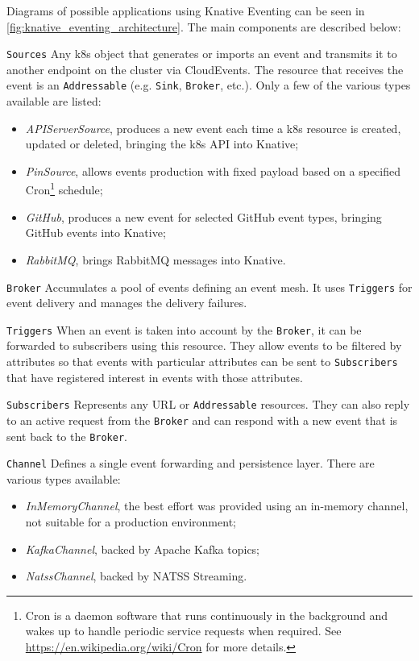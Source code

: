 \documentclass[../thesis.tex]{subfiles}
\begin{document}
Diagrams of possible applications using Knative Eventing can be seen in \autoref{fig:knative_eventing_architecture}. The main components are described below:

\texttt{Sources} Any \gls{k8s} object that generates or imports an event and transmits it to another endpoint on the cluster via CloudEvents. The resource that receives the event is an \texttt{Addressable} (e.g. \texttt{Sink}, \texttt{Broker}, etc.). Only a few of the various types available are listed:

\begin{itemize}
    \item \textit{APIServerSource}, produces a new event each time a \gls{k8s} resource is created, updated or deleted, bringing the \gls{k8s} \acrshort{API} into Knative;
    \item \textit{PinSource}, allows events production with fixed payload based on a specified Cron\footnote{Cron is a daemon software that runs continuously in the background and wakes up to handle periodic service requests when required. See \href{https://en.wikipedia.org/wiki/Cron}{https://en.wikipedia.org/wiki/Cron} for more details.} schedule;
    \item \textit{GitHub}, produces a new event for selected GitHub event types, bringing GitHub events into Knative;
    \item \textit{RabbitMQ}, brings RabbitMQ messages into Knative.
\end{itemize}

\texttt{Broker} Accumulates a pool of events defining an event mesh. It uses \texttt{Triggers} for event delivery and manages the delivery failures.

\texttt{Triggers} When an event is taken into account by the \texttt{Broker}, it can be forwarded to subscribers using this resource. They allow events to be filtered by attributes so that events with particular attributes can be sent to \texttt{Subscribers} that have registered interest in events with those attributes.

\texttt{Subscribers} Represents any \acrshort{URL} or \texttt{Addressable} resources. They can also reply to an active request from the \texttt{Broker} and can respond with a new event that is sent back to the \texttt{Broker}.

\texttt{Channel} Defines a single event forwarding and persistence layer. There are various types available:

\begin{itemize}
    \item \textit{InMemoryChannel}, the best effort was provided using an in-memory channel, not suitable for a production environment;
    \item \textit{KafkaChannel}, backed by Apache Kafka topics;
    \item \textit{NatssChannel}, backed by NATSS Streaming.
\end{itemize}
\end{document}
